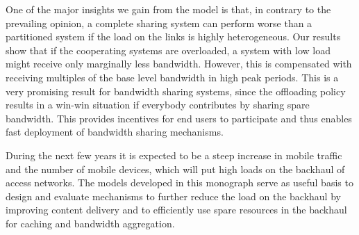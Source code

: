 One of the major insights we gain from the model is that, in contrary to the prevailing opinion, a complete sharing system can perform worse than a partitioned system if the load on the links is highly heterogeneous.
Our results show that if the cooperating systems are overloaded, a system with low load might receive only marginally less bandwidth.
However, this is compensated with receiving multiples of the base level bandwidth in high peak periods.
This is a very promising result for bandwidth sharing systems, since the offloading policy results in a win-win situation if everybody contributes by sharing spare bandwidth.
This provides incentives for end users to participate and thus enables fast deployment of bandwidth sharing mechanisms.

During the next few years it is expected to be a steep increase in mobile traffic and the number of mobile devices, which will put high loads on the backhaul of access networks.
The models developed in this monograph serve as useful basis to design and evaluate mechanisms to further reduce the load on the backhaul by improving content delivery and to efficiently use spare resources in the backhaul for caching and bandwidth aggregation.
